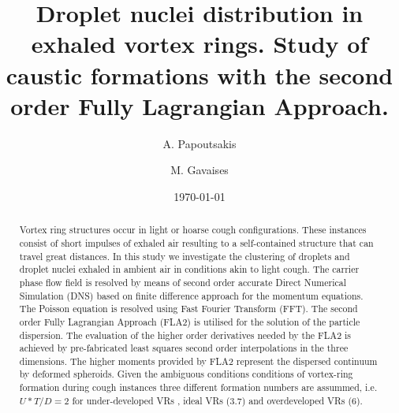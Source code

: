 \documentclass[%
 aip,
 amsmath,amssymb,
 reprint,%
]{revtex4-1}
\begin{document}

\title[Droplet nuclei distribution in exhaled vortex rings.]{Droplet nuclei distribution in exhaled vortex rings. Study of caustic formations with the second order Fully Lagrangian Approach.}





\author{A. Papoutsakis}
\author{M. Gavaises}%


\date{\today}%

\begin{abstract}
	Vortex ring structures occur in light or hoarse cough configurations. These instances consist of short impulses of exhaled air resulting to a self-contained structure that can travel great distances. In this study we investigate the clustering of droplets and droplet nuclei exhaled in ambient air in conditions akin to light cough. The carrier phase flow field is resolved by means of second order accurate Direct Numerical Simulation (DNS) based on finite difference approach for the momentum equations. The Poisson equation is resolved using Fast Fourier Transform (FFT). The second order Fully Lagrangian Approach (FLA2) is utilised for the solution of the particle dispersion. The evaluation of the higher order derivatives needed by the FLA2 is achieved by pre-fabricated least squares second order interpolations in the three dimensions. The higher moments provided by FLA2 represent the dispersed continuum by deformed spheroids. Given the ambiguous conditions conditions of vortex-ring formation during cough instances three different formation numbers are assummed, i.e. $U*T/D=2$ for under-developed VRs , ideal VRs ($3.7$)  and overdeveloped VRs ($6$).
\end{abstract}
\end{document}
